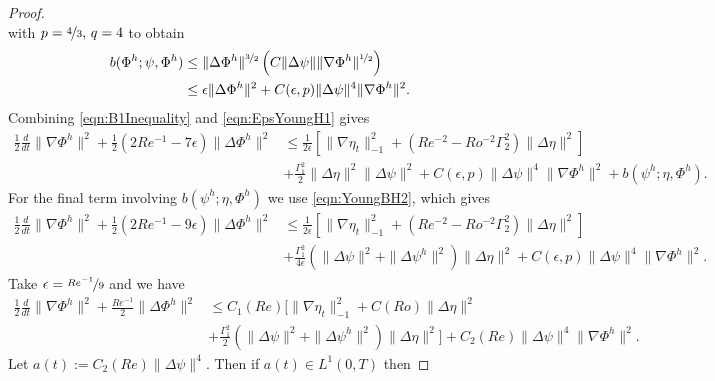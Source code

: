 \begin{proof}
\begin{equation*}
  \end{equation*}
  with $p=\nicefrac{4}{3},\, q = 4$ to obtain
  \begin{align}
    b(\Phi^h; \psi, \Phi^h) &\le \|\Delta \Phi^h\|^{\nicefrac{3}{2}}\left(C
      \|\Delta \psi\| \|\nabla \Phi^h\|^{\nicefrac{1}{2}}\right) \nonumber \\
    &\le \epsilon \|\Delta \Phi^h\|^2 + C(\epsilon,p) \|\Delta \psi\|^4
      \|\nabla \Phi^h\|^2.
    \label{eqn:EpsYoungH1}
  \end{align}
  Combining \eqref{eqn:B1Inequality} and \eqref{eqn:EpsYoungH1} gives
  \begin{align*}
    \frac{1}{2} \frac{d}{dt} \|\nabla \Phi^h\|^2 + \frac{1}{2}\left(2Re^{-1} -
      7 \epsilon \right)\|\Delta \Phi^h\|^2
      &\le \frac{1}{2 \epsilon}\left[\|\nabla \eta_t\|_{-1}^2
      + \left( Re^{-2} - Ro^{-2} \Gamma_2^2 \right) \|\Delta \eta\|^2\right] \\
    & + \frac{\Gamma_1^2}{2}\|\Delta \eta\|^2 \|\Delta \psi\|^2
      + C(\epsilon, p) \|\Delta \psi\|^4 \|\nabla \Phi^h\|^2
      + b(\psi^h;\eta,\Phi^h).
  \end{align*}
  For the final term involving $b(\psi^h; \eta, \Phi^h)$ we use
  \eqref{eqn:YoungBH2}, which gives
  \begin{align*}
    \frac{1}{2} \frac{d}{dt} \|\nabla \Phi^h\|^2 + \frac{1}{2}\left(2Re^{-1} -
      9 \epsilon \right)\|\Delta \Phi^h\|^2
      &\le \frac{1}{2 \epsilon}\left[\|\nabla \eta_t\|_{-1}^2
      + \left( Re^{-2} - Ro^{-2} \Gamma_2^2 \right) \|\Delta \eta\|^2\right] \\
    & + \frac{\Gamma_1^2}{4 \epsilon}
      \left( \|\Delta \psi\|^2 +  \|\Delta \psi^h\|^2\right) \|\Delta \eta\|^2
      + C(\epsilon, p) \|\Delta \psi\|^4 \|\nabla \Phi^h\|^2.
  \end{align*}
  Take $\epsilon = \nicefrac{Re^{-1}}{9}$ and we have
  \begin{equation}
    \begin{split}
      \frac{1}{2} \frac{d}{dt} \|\nabla \Phi^h\|^2
        + \frac{Re^{-1}}{2} \|\Delta \Phi^h\|^2
        & \le C_1(Re) \biggl[\|\nabla \eta_t\|_{-1}^2
         + C(Ro) \|\Delta \eta\|^2 \\
      & + \frac{\Gamma_1^2}{2}
        \left( \|\Delta \psi\|^2 +  \|\Delta \psi^h\|^2\right)
        \|\Delta \eta\|^2\biggr] + C_2(Re) \|\Delta \psi\|^4 \|\nabla \Phi^h\|^2.
    \end{split}
    \label{eqn:NoEps}
  \end{equation}
  Let $a(t):= C_2(Re) \|\Delta \psi\|^4$. Then if $a(t) \in L^1(0,T)$ then

\end{proof}
